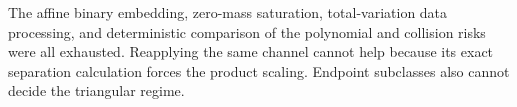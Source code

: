 The affine binary embedding, zero-mass saturation, total-variation data processing, and deterministic comparison of the polynomial and collision risks were all exhausted.  Reapplying the same channel cannot help because its exact separation calculation forces the product scaling.  Endpoint subclasses also cannot decide the triangular regime.